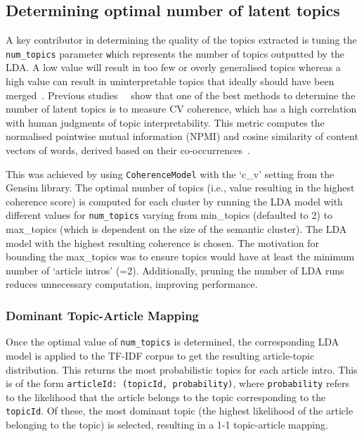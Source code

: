 \subsection{Determining optimal number of latent topics}

A key contributor in determining the quality of the topics extracted is tuning the \texttt{num\_topics} parameter \texttt which represents the number of topics outputted by the LDA. A low value will result in too few or overly generalised topics whereas a high value can result in uninterpretable topics that ideally should have been merged~\cite{topic_score}. Previous studies~\cite{cv_abstract}~\cite{cv_space} show that one of the best methods to determine the number of latent topics is to measure CV coherence, which has a high correlation with human judgments of topic interpretability. This metric computes the normalised pointwise mutual information (NPMI) and cosine similarity of content vectors of words, derived based on their co-occurrences~\cite{cv_space}.

This was achieved by using \texttt{CoherenceModel} with the `c\_v' setting from the Gensim library. The optimal number of topics (i.e., value resulting in the highest coherence score) is computed for each cluster by running the LDA model with different values for \texttt{num\_topics} varying from min\_topics (defaulted to 2) to max\_topics (which is dependent on the size of the semantic cluster). The LDA model with the highest resulting coherence is chosen. The motivation for bounding the max\_topics was to ensure topics would have at least the minimum number of `article intros' (=2). Additionally, pruning the number of LDA runs reduces unnecessary computation, improving performance.

\subsubsection*{Dominant Topic-Article Mapping} \label{sec:topic_article_mapping}
Once the optimal value of \texttt{num\_topics} is determined, the corresponding LDA model is applied to the TF-IDF corpus to get the resulting article-topic distribution. This returns the most probabilistic topics for each article intro. This is of the form \texttt{articleId: (topicId, probability)}, where \texttt{probability} refers to the likelihood that the article belongs to the topic corresponding to the \texttt{topicId}. Of these, the most dominant topic (the highest likelihood of the article belonging to the topic) is selected, resulting in a 1-1 topic-article mapping. 

